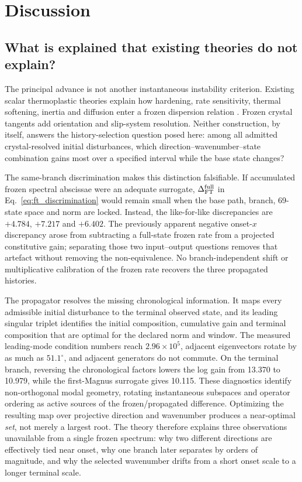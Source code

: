 \section{Discussion}
\label{sec:discussion_dynamic}

\subsection{What is explained that existing theories do not explain?}

The principal advance is not another instantaneous instability criterion. Existing scalar thermoplastic theories explain how hardening, rate sensitivity, thermal softening, inertia and diffusion enter a frozen dispersion relation \cite{Bai1982,WrightBatra1985,MolinariClifton1987,Wright2002}. Frozen crystal tangents add orientation and slip-system resolution. Neither construction, by itself, answers the history-selection question posed here: among all admitted crystal-resolved initial disturbances, which direction--wavenumber--state combination gains most over a specified interval while the base state changes?

The same-branch discrimination makes this distinction falsifiable. If accumulated frozen spectral abscissae were an adequate surrogate, $\Delta_{\rm FT}^{\rm full}$ in Eq.~\eqref{eq:ft_discrimination} would remain small when the base path, branch, 69-state space and norm are locked. Instead, the like-for-like discrepancies are $+4.784$, $+7.217$ and $+6.402$. The previously apparent negative onset-$x$ discrepancy arose from subtracting a full-state frozen rate from a projected constitutive gain; separating those two input--output questions removes that artefact without removing the non-equivalence. No branch-independent shift or multiplicative calibration of the frozen rate recovers the three propagated histories.

The propagator resolves the missing chronological information. It maps every admissible initial disturbance to the terminal observed state, and its leading singular triplet identifies the initial composition, cumulative gain and terminal composition that are optimal for the declared norm and window. The measured leading-mode condition numbers reach $2.96\times10^5$, adjacent eigenvectors rotate by as much as $51.1^\circ$, and adjacent generators do not commute. On the terminal branch, reversing the chronological factors lowers the log gain from 13.370 to 10.979, while the first-Magnus surrogate gives 10.115. These diagnostics identify non-orthogonal modal geometry, rotating instantaneous subspaces and operator ordering as active sources of the frozen/propagated difference. Optimizing the resulting map over projective direction and wavenumber produces a near-optimal \emph{set}, not merely a largest root. The theory therefore explains three observations unavailable from a single frozen spectrum: why two different directions are effectively tied near onset, why one branch later separates by orders of magnitude, and why the selected wavenumber drifts from a short onset scale to a longer terminal scale.

